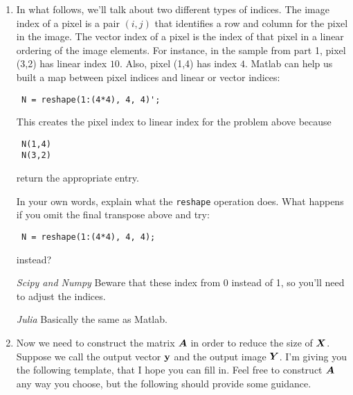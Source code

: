 \documentclass{article}
\begin{document}
\begin{enumerate}
\begin{verbatim} colormap(gray)\end{verbatim}
Save the resulting Matlab figure as an image to include in your homework. (You'{}ll need to do this for future homeworks, so make sure you know how to do it on this one!)

\emph{Scipy and Numpy} use {\colorbox[rgb]{1.00,0.93,1.00}{\tt imshow\char40X\char32extent}} and {\colorbox[rgb]{1.00,0.93,1.00}{\tt set\char95cmap\char39gray}} instead


\item In what follows, we'{}ll talk about two different types of indices. The image index of a pixel is a pair $(i,j)$ that identifies a row and column for the pixel in the image. The vector index of a pixel is the index of that pixel in a linear ordering of the image elements. For instance, in the sample from part 1, pixel (3,2) has linear index $10$. Also, pixel (1,4) has index $4$. Matlab can help us built a map between pixel indices and linear or vector indices:

\begin{verbatim} N = reshape(1:(4*4), 4, 4)';\end{verbatim}
This creates the pixel index to linear index for the problem above because

\begin{verbatim} N(1,4) 
 N(3,2)\end{verbatim}
return the appropriate entry.

In your own words, explain what the {\colorbox[rgb]{1.00,0.93,1.00}{\tt reshape}} operation does. What happens if you omit the final transpose above and try:

\begin{verbatim} N = reshape(1:(4*4), 4, 4);\end{verbatim}
instead?

\emph{Scipy and Numpy} Beware that these index from 0 instead of 1, so you'{}ll need to adjust the indices.

\emph{Julia} Basically the same as Matlab.


\item Now we need to construct the matrix $\boldsymbol{A}$ in order to reduce the size of $\boldsymbol{X}$. Suppose we call the output vector $\boldsymbol{\mathrm{y}}$ and the output image $\boldsymbol{Y}$. I'{}m giving you the following template, that I hope you can fill in. Feel free to construct $\boldsymbol{A}$ any way you choose, but the following should provide some guidance.


\end{enumerate}
\end{document}
